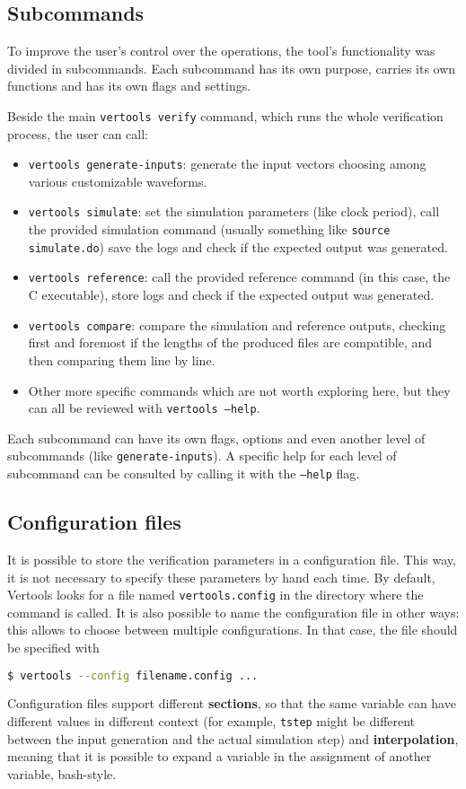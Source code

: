 \subsection{Subcommands}
To improve the user's control over the operations, the tool's functionality was divided in subcommands. Each subcommand has its own purpose, carries its own functions and has its own flags and settings.

Beside the main \texttt{vertools verify} command, which runs the whole verification process, the user can call:

\begin{itemize}
    \item \texttt{vertools generate-inputs}: generate the input vectors choosing among various customizable waveforms.
    \item \texttt{vertools simulate}: set the simulation parameters (like clock period), call the provided simulation command (usually something like \texttt{source simulate.do}) save the logs and check if the expected output was generated.
    \item \texttt{vertools reference}: call the provided reference command (in this case, the C executable), store logs and check if the expected output was generated.
    \item \texttt{vertools compare}: compare the simulation and reference outputs, checking first and foremost if the lengths of the produced files are compatible, and then comparing them line by line.
    \item Other more specific commands which are not worth exploring here, but they can all be reviewed with \texttt{vertools --help}.
\end{itemize}

Each subcommand can have its own flags, options and even another level of subcommands (like \texttt{generate-inputs}). A specific help for each level of subcommand can be consulted by calling it with the \texttt{--help} flag.

\subsection{Configuration files}
It is possible to store the verification parameters in a configuration file. This way, it is not necessary to specify these parameters by hand each time. By default, Vertools looks for a file named \texttt{vertools.config} in the directory where the command is called. It is also possible to name the configuration file in other ways: this allows to choose between multiple configurations. In that case, the file should be specified with
\begin{lstlisting}[language=bash]
    $ vertools --config filename.config ...
\end{lstlisting}
Configuration files support different \textbf{sections}, so that the same variable can have different values in different context (for example, \texttt{tstep} might be different between the input generation and the actual simulation step) and \textbf{interpolation}, meaning that it is possible to expand a variable in the assignment of another variable, bash-style.

